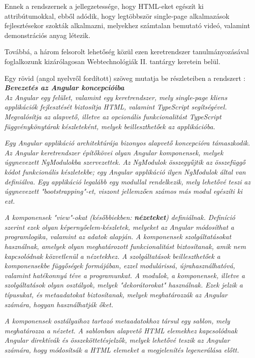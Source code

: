 Ennek a rendszernek a jellegzetessége, hogy HTML-eket egészít ki attribútumokkal, ebből adódik, hogy legtöbbször single-page alkalmazások fejlesztésekor szokták alkalmazni, melyekhez számtalan bemutató videó, valamint demonstrációs anyag létezik.

Továbbá, a három felsorolt lehetőség közül ezen keretrendszer tanulmányozásával foglalkozunk kizárólagosan Webtechnológiák II. tantárgy keretein belül.

Egy rövid (angol nyelvről fordított) szöveg mutatja be részleteiben a rendszert \cite{angularcikk}:\\

\noindent\textit{\textbf{\large{Bevezetés az Angular koncepcióiba}}}\\

\textit{Az Angular egy felület, valamint egy keretrendszer, mely single-page kliens applikációk fejlesztését biztosítja HTML, valamint TypeScript segítségével. Megvalósítja az alapvető, illetve az opcionális funkcionalitást TypeScript függvénykönytárak készleteként, melyek beilleszthetőek az applikációba.}

\textit{Egy Angular applikáció architektúrája bizonyos alapvető koncepcióra támaszkodik. Az Angular keretrendszer építőkövei olyan Angular komponensek, melyek úgynevezett NgModulokba szervezettek. Az NgModulok összegyűjtik az összefüggő kódot funkcionális készletekbe; egy Angular applikáció ilyen NgModulok által van definiálva. Egy applikáció legalább egy modullal rendelkezik, mely lehetővé teszi az úgynevezett "bootstrapping"-et, viszont jellemzően számos más modul egészíti ki ezt.}

\textit{A komponensek "view"-okat (későbbiekben: \textbf{nézeteket}) definiálnak. Definíció szerint ezek olyan képernyőelem-készletek, melyeket az Angular módosíthat a programlogika, valamint az adatok alapján. A komponensek szolgáltatásokat használnak, amelyek olyan meghatározott funkcionalitást biztosítanak, amik nem kapcsolódnak közvetlenül a nézetekhez. A szolgáltatások beilleszthetőek a komponensekbe függőségek formájában, ezzel modulárissá, újrahasználhatóvá, valamint hatékonnyá téve a programunkat. A modulok, a komponensek, illetve a szolgáltatások olyan osztályok, melyek "dekorátorokat" használnak. Ezek jelzik a típusukat, és metaadatokat biztosítanak, melyek meghatározzák az Angular számára, hogyan használhatják őket.}

\textit{A komponensek osztályaihoz tartozó metaadatokhoz társul egy sablon, mely meghatározza a nézetet. A sablonban alapvető HTML elemekhez kapcsolódnak Angular direktívák és összeköttetésjelzők, melyek lehetővé teszik az Angular számára, hogy módosítsák a HTML elemeket a megjelenítés legenerálása előtt.}

